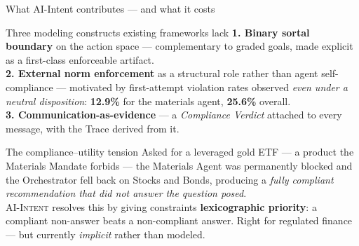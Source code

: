 \documentclass[aspectratio=169,10pt]{beamer}
\newcommand{\ai}{\textsc{AI-Intent}}
\newcommand{\key}[1]{\textcolor{aiAccent}{\textbf{#1}}}
\newcommand{\cn}[1]{\textcolor{aiPrimary}{\textit{#1}}}   %
\begin{document}
\begin{frame}{What AI-Intent contributes --- and what it costs}
  \begin{block}{Three modeling constructs existing frameworks lack}
    \small
    \textbf{1. Binary sortal boundary} on the action space --- complementary to
    graded goals, made explicit as a first-class enforceable artifact.\\[0.3em]
    \textbf{2. External norm enforcement} as a structural role rather than agent
    self-compliance --- motivated by first-attempt violation rates observed
    \emph{even under a neutral disposition}: \key{12.9\%} for the materials
    agent, \key{25.6\%} overall.\\[0.3em]
    \textbf{3. Communication-as-evidence} --- a \cn{Compliance Verdict} attached
    to every message, with the Trace derived from it.
  \end{block}
  \begin{block}{The compliance--utility tension}
    \small
    Asked for a leveraged gold ETF --- a product the Materials Mandate forbids ---
    the Materials Agent was permanently blocked and the Orchestrator fell back on
    Stocks and Bonds, producing a \emph{fully compliant recommendation that did
    not answer the question posed}.\\[0.3em]
    \ai{} resolves this by giving constraints \key{lexicographic priority}: a
    compliant non-answer beats a non-compliant answer. Right for regulated
    finance --- but currently \emph{implicit} rather than modeled.
  \end{block}
\end{frame}
\end{document}
